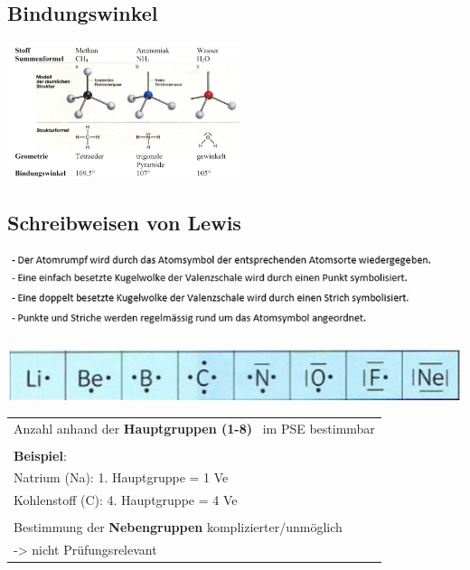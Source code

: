 \subsection{Bindungswinkel}
\begin{center}
	\includegraphics[height=4cm]{images/Winkel.png}
\end{center}

\subsection{Schreibweisen von Lewis} 

\begin{center}
	\includegraphics[width=\columnwidth]{images/lewis-schreibweise.png}
\end{center}
\begin{center}
	\includegraphics[width=\columnwidth]{images/Lewis-schreibweise_2.png}
\end{center}

\begin{tabular}{l}
	Anzahl anhand der \textbf{Hauptgruppen (1-8)}~ im PSE bestimmbar \\
	\\
	\textbf{Beispiel}: \\
	Natrium (Na): 1. Hauptgruppe = 1 Ve \\
	Kohlenstoff (C): 4. Hauptgruppe = 4 Ve \\
	\\
	Bestimmung der \textbf{Nebengruppen} komplizierter/unmöglich \\ -> nicht Prüfungsrelevant \\
\end{tabular}


